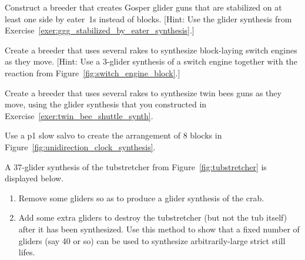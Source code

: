 \begin{multicols}{2}
\mfilbreak


\begin{problem}\label{exer:ggg_eater_side_breeder}
	Construct a breeder that creates Gosper glider guns that are stabilized on at least one side by eater~1s instead of blocks. [Hint: Use the glider synthesis from Exercise~\ref{exer:ggg_stabilized_by_eater_synthesis}.]
\end{problem}


\mfilbreak


\begin{problem}\label{exer:block_laying_switch_breeder}
	Create a breeder that uses several rakes to synthesize block-laying switch engines as they move. [Hint: Use a $3$-glider synthesis of a switch engine together with the reaction from Figure~\ref{fig:switch_engine_block}.]
\end{problem}


\mfilbreak


\begin{problem}\label{exer:new_gun_breeder}
	Create a breeder that uses several rakes to synthesize twin bees guns as they move, using the glider synthesis that you constructed in Exercise~\ref{exer:twin_bee_shuttle_synth}.
\end{problem}


\mfilbreak


\begin{problem}\label{exer:slow_salvo_8_blocks}
	Use a p1 slow salvo to create the arrangement of $8$ blocks in Figure~\ref{fig:unidirection_clock_synthesis}.
\end{problem}


\mfilbreak


\begin{problemstar}\label{exer:large_still_life_synth}
	A 37-glider synthesis of the tubstretcher from Figure~\ref{fig:tubstretcher} is displayed below.
	\begin{center}
	\end{center}
	\begin{enumerate}[label=\bf\color{ocre}(\alph*)]
		\item Remove some gliders so as to produce a glider synthesis of the crab.
		
		\item Add some extra gliders to destroy the tubstretcher (but not the tub itself) after it has been synthesized. Use this method to show that a fixed number of gliders (say 40 or so) can be used to synthesize arbitrarily-large strict still lifes.
	\end{enumerate}
\end{problemstar}



\end{multicols}
